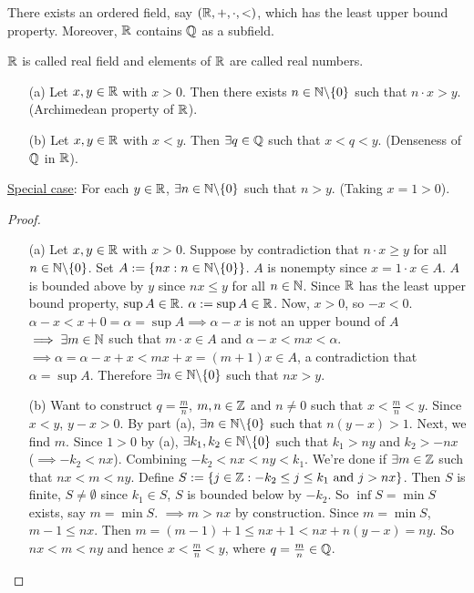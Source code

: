 \documentclass[]{article}
\begin{document}
\begin{theorem}
	 There exists an ordered field, say $(\mathbb{R},+,\cdot,<)$, which has the least upper bound property. Moreover, $\mathbb{R}$ contains $\mathbb{Q}$ as a subfield.
\end{theorem}
\begin{note}
	$\mathbb{R}$ is called real field and elements of $\mathbb{R}$ are called real numbers.
\end{note}

\begin{theorem}
	\begin{enumerate}
		\item[(a)] Let $x,y\in\mathbb{R}$ with $x>0$. Then there exists $n\in\mathbb{N}\backslash\{0\}$ such that $n\cdot x>y$. (Archimedean property of $\mathbb{R}$).
		\item[(b)] Let $x,y\in\mathbb{R}$ with $x<y$. Then $\exists q\in\mathbb{Q}$ such that $x<q<y$. (Denseness of $\mathbb{Q}$ in $\mathbb{R}$).
	\end{enumerate}
	\ul{Special case}: For each $y\in\mathbb{R}$, $\exists n\in\mathbb{N}\backslash \{0\}$ such that $n>y$. (Taking $x=1>0$).
\end{theorem}
\begin{proof}
	\begin{enumerate}
		\item[(a)] Let $x,y\in\mathbb{R}$ with $x>0$. Suppose by contradiction that $n\cdot x \geq y$ for all $n\in\mathbb{N}\backslash\{0\}$. Set $A:=\{nx:n\in\mathbb{N}\backslash\{0\}\}$. $A$ is nonempty since $x = 1\cdot x\in A$. $A$ is bounded above by $y$ since $nx\leq y$ for all $n\in\mathbb{N}$. Since $\mathbb{R}$ has the least upper bound property, $\sup A\in\mathbb{R}$. $\alpha:= \sup A\in\mathbb{R}$. Now, $x>0$, so $-x<0$. $\alpha-x < x+0 = \alpha = \sup A \implies \alpha - x$ is not an upper bound of $A$ $\implies \exists m\in\mathbb{N}$ such that $m\cdot x\in A$ and $\alpha-x<mx<\alpha$. $\implies \alpha= \alpha - x + x < mx + x = (m+1)x\in A$, a contradiction that $\alpha = \sup A$. Therefore $\exists n\in\mathbb{N}\backslash \{0\}$ such that $nx>y$.
		\item[(b)] Want to construct $q = \frac{m}{n}$, $m,n\in\mathbb{Z}$ and $n\neq 0$ such that $x<\frac{m}{n}<y$. Since $x<y$, $y-x>0$. By part (a), $\exists n\in\mathbb{N}\backslash \{0\}$ such that $n(y-x)>1$. Next, we find $m$. Since $1>0$ by (a), $\exists k_1,k_2\in\mathbb{N}\backslash \{0\}$ such that $k_1>ny$ and $k_2>-nx$ ($\implies -k_2<nx$). Combining $-k_2<nx<ny<k_1$. We're done if $\exists m\in\mathbb{Z}$ such that $nx<m<ny$. Define $S:=\{j\in\mathbb{Z}:-k_2\leq j\leq k_1 \text{ and } j>nx\}$. Then $S$ is finite, $S\neq \emptyset$ since $k_1\in S$, $S$ is bounded below by $-k_2$. So $\inf S = \min S$ exists, say $m = \min S$. $\implies m>nx$ by construction. Since $m=\min S$, $m-1 \leq nx$. Then $m = (m-1)+1 \leq nx+1 < nx+n(y-x) = ny$. So $nx<m<ny$ and hence $x<\frac{m}{n}<y$, where $q = \frac{m}{n}\in\mathbb{Q}$.
	\end{enumerate}
\end{proof}
\end{document}
